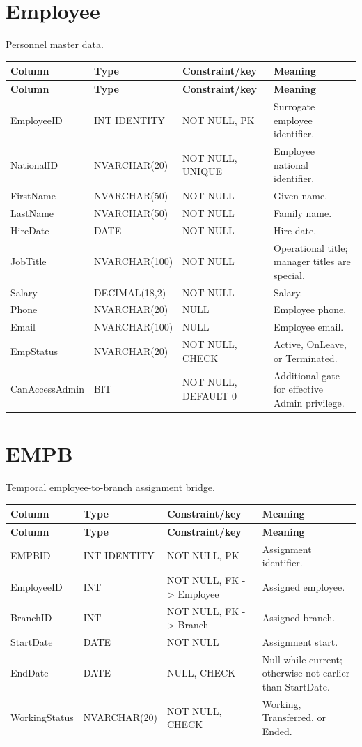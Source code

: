 \documentclass[11pt,a4paper,oneside]{report}
\begin{document}
\section{Employee}
Personnel master data.
\begin{longtable}{L{0.21\textwidth}L{0.18\textwidth}L{0.24\textwidth}L{0.31\textwidth}}
\toprule
\textbf{Column} & \textbf{Type} & \textbf{Constraint/key} & \textbf{Meaning}\\
\midrule\endfirsthead
\toprule\textbf{Column} & \textbf{Type} & \textbf{Constraint/key} & \textbf{Meaning}\\\midrule\endhead
EmployeeID & INT IDENTITY & NOT NULL, PK & Surrogate employee identifier.\\
NationalID & NVARCHAR(20) & NOT NULL, UNIQUE & Employee national identifier.\\
FirstName & NVARCHAR(50) & NOT NULL & Given name.\\
LastName & NVARCHAR(50) & NOT NULL & Family name.\\
HireDate & DATE & NOT NULL & Hire date.\\
JobTitle & NVARCHAR(100) & NOT NULL & Operational title; manager titles are special.\\
Salary & DECIMAL(18,2) & NOT NULL & Salary.\\
Phone & NVARCHAR(20) & NULL & Employee phone.\\
Email & NVARCHAR(100) & NULL & Employee email.\\
EmpStatus & NVARCHAR(20) & NOT NULL, CHECK & Active, OnLeave, or Terminated.\\
CanAccessAdmin & BIT & NOT NULL, DEFAULT 0 & Additional gate for effective Admin privilege.\\
\bottomrule
\end{longtable}

\section{EMPB}
Temporal employee-to-branch assignment bridge.
\begin{longtable}{L{0.21\textwidth}L{0.18\textwidth}L{0.24\textwidth}L{0.31\textwidth}}
\toprule
\textbf{Column} & \textbf{Type} & \textbf{Constraint/key} & \textbf{Meaning}\\
\midrule\endfirsthead
\toprule\textbf{Column} & \textbf{Type} & \textbf{Constraint/key} & \textbf{Meaning}\\\midrule\endhead
EMPBID & INT IDENTITY & NOT NULL, PK & Assignment identifier.\\
EmployeeID & INT & NOT NULL, FK -> Employee & Assigned employee.\\
BranchID & INT & NOT NULL, FK -> Branch & Assigned branch.\\
StartDate & DATE & NOT NULL & Assignment start.\\
EndDate & DATE & NULL, CHECK & Null while current; otherwise not earlier than StartDate.\\
WorkingStatus & NVARCHAR(20) & NOT NULL, CHECK & Working, Transferred, or Ended.\\
\bottomrule
\end{longtable}
\end{document}
